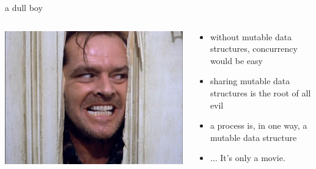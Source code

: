 \begin{frame}{a dull boy}

\begin{columns}
 \begin{column}{0.5\linewidth}
   \includegraphics[width=\linewidth]{shining.jpg}
 \end{column}
 \pause
 \begin{column}{0.5\linewidth}
   \begin {itemize}
    \item without mutable data structures, concurrency would be easy
    \item sharing mutable data structures is the root of all evil
    \item a process is, in one way, a mutable data structure
    \pause
    \item ... It's only a movie.
   \end{itemize}
 \end{column}
 \end{columns}

\end{frame}

